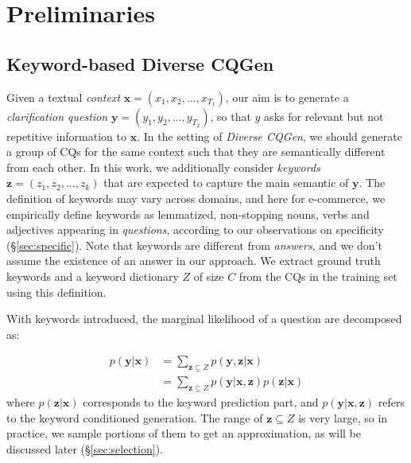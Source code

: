 \section{Preliminaries}

\subsection{Keyword-based Diverse CQGen}

Given a textual \textit{context} $\mathbf{x} = (x_1, x_2, ..., x_{T_1})$, our aim is to generate a \textit{clarification question} $\mathbf{y} = (y_1, y_2, ..., y_{T_2})$, so that $y$ asks for relevant but not repetitive information to $\mathbf{x}$. In the setting of \textit{Diverse CQGen}, we should generate a group of CQs for the same context such that they are semantically different from each other. In this work, we additionally consider \textit{keywords} $\mathbf{z} = (z_1, z_2, ..., z_k)$ that are expected to capture the main semantic of $\mathbf{y}$. The definition of keywords may vary across domains, and here for e-commerce, we empirically define keywords as lemmatized, non-stopping nouns, verbs and adjectives appearing in \textit{questions}, according to our observations on specificity (\S \ref{sec:specific}). Note that keywords are different from \textit{answers}, and we don't assume the 
existence of an answer in our approach. We extract ground truth keywords and a keyword dictionary 
$Z$ of size $C$ from the CQs in the training set using this definition. 

With keywords introduced, the marginal likelihood of a question are 
decomposed as:

\begin{equation}
  \begin{split}
    p(\mathbf{y}|\mathbf{x}) &= \sum_{\mathbf{z} \subseteq Z}p(\mathbf{y},\mathbf{z}|\mathbf{x}) \\ 
    &= \sum_{\mathbf{z} \subseteq Z}p(\mathbf{y}|\mathbf{x},\mathbf{z})p(\mathbf{z}|\mathbf{x})
  \end{split}
  \label{equ:decompose}
\end{equation}
where $p(\mathbf{z}|\mathbf{x})$ corresponds to the keyword prediction part, and $p(\mathbf{y}|\mathbf{x},\mathbf{z})$ refers to the keyword conditioned generation. The range of $\mathbf{z} \subseteq Z$ is very large, so in practice, we sample portions of them to get an approximation, as will be discussed later (\S \ref{sec:selection}).

